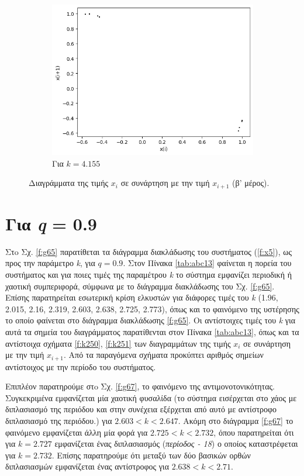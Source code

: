 \begin{figure}[ht]
\begin{subfigure}[b]{0.4\textwidth}
		\includegraphics[width=\textwidth]{LateX images/cheb q=0.8/g14}
		\caption{Για $k=4.155$}
		\label{f:k141}
	\end{subfigure}
	\hfill
	\caption{Διαγράμματα της τιμής \(x_i\) σε συνάρτηση με την τιμή \(x_{i+1}\) (β' μέρος).}
	\label{f:k249}
\end{figure}

\clearpage

\section{Για \emph{q} = 0.9}

Στo Σχ. \ref{f:g65} παρατίθεται τα διάγραμμα διακλάδωσης του συστήματος (\ref{f:x5}), ως προς την παράμετρο \emph{k}, για $q =0.9$. Στον Πίνακα \ref{tab:abc13} φαίνεται η πορεία του συστήματος και για ποιες τιμές της παραμέτρου \emph{k} το σύστημα εμφανίζει περιοδική ή χαοτική συμπεριφορά, σύμφωνα με το διάγραμμα διακλάδωσης του Σχ. \ref{f:g65}. Επίσης παρατηρείται εσωτερική κρίση ελκυστών για διάφορες τιμές του \emph{k} (1.96, 2.015, 2.16, 2.319, 2.603, 2.638, 2.725, 2.773), όπως και το φαινόμενο της υστέρησης το οποίο φαίνεται στο διάγραμμα διακλάδωσης \ref{f:g65}. Οι αντίστοιχες τιμές του \emph{k} για αυτά τα σημεία του διαγράμματος παρατίθενται στον Πίνακα \ref{tab:abc13}, όπως και τα αντίστοιχα σχήματα \ref{f:k250}, \ref{f:k251} των διαγραμμάτων της τιμής \(x_i\) σε συνάρτηση με την τιμή \(x_{i+1}\). Από τα παραγόμενα σχήματα προκύπτει αριθμός σημείων αντίστοιχος με την περίοδο του συστήματος.

Επιπλέον παρατηρούμε στo Σχ. \ref{f:g67}, το φαινόμενο της αντιμονοτονικότητας. Συγκεκριμένα εμφανίζεται μία χαοτική φυσαλίδα (το σύστημα εισέρχεται στο χάος με διπλασιασμό της περιόδου και στην συνέχεια εξέρχεται από αυτό με αντίστροφο διπλασιασμό της περιόδου.) για $2.603<k<2.647$. Ακόμη στο διάγραμμα \ref{f:g67} το φαινόμενο εμφανίζεται άλλη μία φορά για $2.725<k<2.732$, όπου παρατηρείται ότι για $k=2.727$ εμφανίζεται ένας διπλασιασμός (\emph{περίοδος - 18}) ο οποίος καταστρέφεται για $k=2.732$.
Επίσης παρατηρούμε ότι μεταξύ των δύο βασικών ορθών διπλασιασμών εμφανίζεται ένας αντίστροφος για $2.638<k<2.71$.

